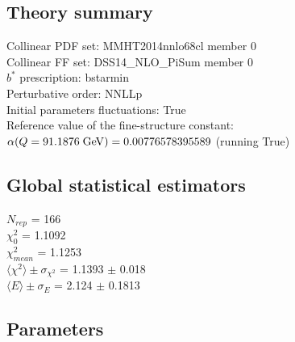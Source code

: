 \documentclass[
]{article}
\begin{document}
\hypertarget{theory-summary}{%
\subsection{Theory summary}\label{theory-summary}}

Collinear PDF set: MMHT2014nnlo68cl member 0\\
Collinear FF set: DSS14\_NLO\_PiSum member 0\\
\(b^*\) prescription: bstarmin\\
Perturbative order: NNLLp\\
Initial parameters fluctuations: True\\
Reference value of the fine-structure constant:
\(\alpha(Q = 91.1876\;{\rm GeV}) = 0.00776578395589\) (running True)

\hypertarget{global-statistical-estimators}{%
\subsection{Global statistical
estimators}\label{global-statistical-estimators}}

\(N_{rep}\) = 166\\
\(\chi_{0}^2\) = 1.1092\\
\(\chi_{mean}^2\) = 1.1253\\
\(\langle\chi^2\rangle \pm \sigma_{\chi^2}\) = 1.1393 \(\pm\) 0.018\\
\(\langle E \rangle \pm \sigma_{E}\) = 2.124 \(\pm\) 0.1813

\hypertarget{parameters}{%
\subsection{Parameters}\label{parameters}}
\end{document}
